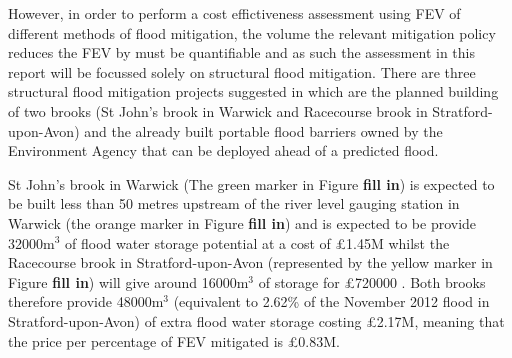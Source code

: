\documentclass[11pt,a4paper]{article}
\begin{document}
However, in order to perform a cost effictiveness assessment using FEV of different methods of flood mitigation, the volume the relevant mitigation policy reduces the FEV by must be quantifiable and as such the assessment in this report will be focussed solely on structural flood mitigation. There are three structural flood mitigation projects suggested in \cite{war1} which are the planned building of two brooks (St John's brook in Warwick and Racecourse brook in Stratford-upon-Avon) and the already built portable flood barriers owned by the Environment Agency that can be deployed ahead of a predicted flood.

St John's brook in Warwick (The green marker in Figure \textbf{fill in}) is expected to be built less than 50 metres upstream of the river level gauging station in Warwick (the orange marker in Figure \textbf{fill in}) and is expected to be provide 32000m$^3$ of flood water storage potential at a cost of \pounds1.45M whilst the Racecourse brook in Stratford-upon-Avon (represented by the yellow marker in Figure \textbf{fill in}) will give around 16000m$^3$ of storage for \pounds720000 \cite{brook}. Both brooks therefore provide 48000m$^3$ (equivalent to 2.62\% of the November 2012 flood in Stratford-upon-Avon) of extra flood water storage costing \pounds2.17M, meaning that the price per percentage of FEV mitigated is \pounds0.83M.
\end{document}
